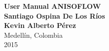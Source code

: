 \begin{center}
\thispagestyle{empty} \vspace*{0cm} \textbf{\huge
User Manual ANISOFLOW}\\[2.5cm]
\Large\textbf{Santiago Ospina De Los Ríos}\\
\Large\textbf{Kevin Alberto Pérez}\\[2.5cm]
Medellín, Colombia\\
2015\\
\end{center}

\newpage{\pagestyle{empty}\cleardoublepage}





